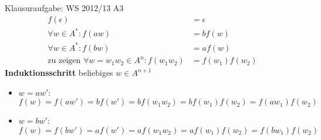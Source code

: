 \begin{frame}[t]{Klausuraufgabe: WS 2012/13 A3}
  \begin{align*}
    f(\epsilon)&=\epsilon\\
    \forall w\in A^*: f(aw)&=bf(w)\\
    \forall w\in A^*: f(bw)&=af(w)\\
    \text{zu zeigen }\forall w=w_1w_2\in A^n: f(w_1w_2)&=f(w_1)f(w_2)
  \end{align*}
  \textbf{Induktionsschritt} beliebiges $w\in A^{n+1}$\\
  \pause
  \begin{itemize}
    \item $w=aw'$:
    \pause
    $f(w)=f(aw')=bf(w')=bf(w_1w_2)=bf(w_1)f(w_2)=f(aw_1)f(w_2)$
    \pause
    \item $w=bw'$: $f(w)=f(bw')=af(w')=af(w_1w_2)=af(w_1)f(w_2)=f(bw_1)f(w_2)$
  \end{itemize}
\end{frame}
